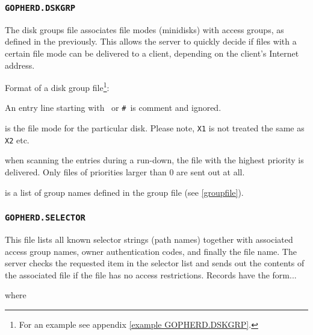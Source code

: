 \subsubsection{{\tt GOPHERD.DSKGRP}}\label{dskgrpfile}

The disk groups file associates file modes (minidisks) with access groups,
as defined in the previously.  This allows the server to quickly decide
if files with a certain file mode can be delivered to a client,
depending on the client's Internet address.

\noindent Format of a disk group file\footnote{For an example
see appendix \ref{example GOPHERD.DSKGRP}.}:\\
\begin{center}
\end{center}
An entry line starting with {\tt *}\ or {\tt \#}\ is comment
and ignored.

 is the file mode for the particular disk.
Please note, {\tt X1} is not treated the same as {\tt X2} etc.

 when scanning the entries during a run-down,
the file with the highest priority is delivered.  Only files of
priorities larger than 0 are sent out at all.

 is a list of group names defined in the group
file (see \ref{groupfile}).



\subsubsection{{\tt GOPHERD.SELECTOR}}\label{selectorfile}

  This file lists all known selector strings (path names)
  together with associated access group names,
  owner authentication codes, and finally the file name.
  The server checks the requested item in the selector list
  and sends out the contents of the
  associated file if the file has no access restrictions.
  Records have the form...\\
\rule{0mm}{1mm}

\begin{center}
\end{center}

\rule{0mm}{3mm}

\noindent where\\ \rule{0mm}{2mm}

